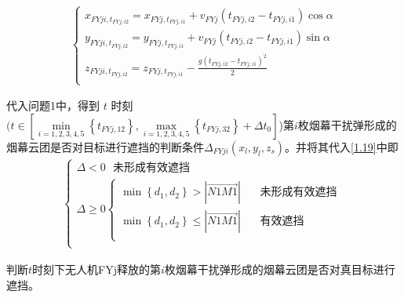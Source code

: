 \documentclass[../main.tex]{subfiles}
\begin{document}
\begin{itemize}
\begin{align}\label{19.4}
\left\{ \begin{array}{l}
	x_{FYji,t_{FYj,i2}}=x_{FYj,t_{FYj,i1}}+v_{FYj}\left( t_{FYj,i2}-t_{FYj,i1} \right) \cos \alpha\\
	y_{FYji,t_{FYj,i2}}=y_{FYj,t_{FYj,i1}}+v_{FYj}\left( t_{FYj,i2}-t_{FYj,i1} \right) \sin \alpha\\
	z_{FYji,t_{FYj,i2}}=z_{FYj,t_{FYj,i1}}-\frac{g\left( t_{FYj,i2}-t_{FYj,i1} \right) ^2}{2}\\
\end{array} \right. 
\end{align}
\par 代入问题1中，得到 $t$ 时刻$(t\in \left[ \underset{i=1,2,3,4,5}{\min}\left\{ t_{FYj,12} \right\} ,\underset{i=1,2,3,4,5}{\max}\left\{ t_{FYj,32} \right\} +\Delta t_0 \right]$)第$i$枚烟幕干扰弹形成的烟幕云团是否对目标进行遮挡的判断条件$\Delta _{FYji}\left( x_l,y_l,z_s \right) $。并将其代入\eqref{1.19}中即
\begin{align}\label{1.88}
	\left\{ \begin{array}{l}
	\varDelta <0\ \ \ \text{未形成有效遮挡}\\
	\varDelta \ge 0\left\{ \begin{array}{l}
	\min \left\{ d_1,d_2 \right\} >\left| \overrightarrow{N1M1} \right|\ \ \ \ \ \ \ \ \text{未形成有效遮挡}\\
	\min \left\{ d_1,d_2 \right\} \le \left| \overrightarrow{N1M1} \right|\ \ \ \ \ \ \ \ \text{有效遮挡}\\
\end{array} \right.\\
\end{array} \right. 
\end{align}
\par 判断$t$时刻下无人机FYj释放的第$i$枚烟幕干扰弹形成的烟幕云团是否对真目标进行遮挡。
\end{itemize}
\end{document}

